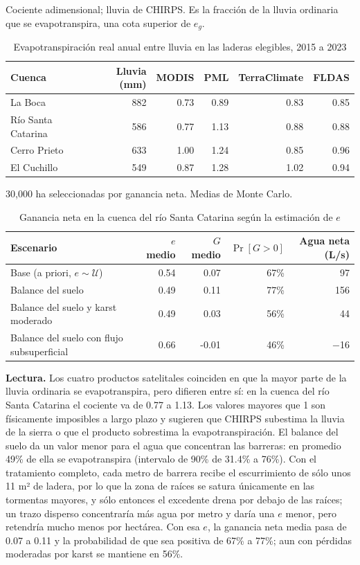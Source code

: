 \documentclass[11pt,letterpaper]{article}
\newcommand{\lectura}[1]{\par\noindent\textcolor{naranja}{\textbf{Lectura.}} #1\par}
\begin{document}
\begin{table}[H]\centering\small
\caption{Evapotranspiración real anual entre lluvia en las laderas elegibles, 2015 a 2023}\label{tab:et_sat}
{\color{gris}Cociente adimensional; lluvia de CHIRPS. Es la fracción de la lluvia ordinaria que se evapotranspira, una cota superior de $e_g$.\par}\smallskip
\begin{tabularx}{\linewidth}{Xrrrrr}
\toprule
Cuenca & Lluvia (mm) & MODIS & PML & TerraClimate & FLDAS \\
\midrule
La Boca & 882 & 0.73 & 0.89 & 0.83 & 0.85 \\
Río Santa Catarina & 586 & 0.77 & 1.13 & 0.88 & 0.88 \\
Cerro Prieto & 633 & 1.00 & 1.24 & 0.85 & 0.96 \\
El Cuchillo & 549 & 0.87 & 1.28 & 1.02 & 0.94 \\
\bottomrule
\end{tabularx}
\end{table}

\begin{table}[H]\centering\small
\caption{Ganancia neta en la cuenca del río Santa Catarina según la estimación de $e$}\label{tab:et_net}
{\color{gris}30,000 ha seleccionadas por ganancia neta. Medias de Monte Carlo.\par}\smallskip
\begin{tabularx}{\linewidth}{Xrrrr}
\toprule
Escenario & $e$ medio & $G$ medio & $\Pr[G>0]$ & Agua neta (L/s) \\
\midrule
Base (a priori, $e\sim\mathcal U$) & 0.54 & 0.07 & 67\% & 97 \\
Balance del suelo & 0.49 & 0.11 & 77\% & 156 \\
Balance del suelo y karst moderado & 0.49 & 0.03 & 56\% & 44 \\
Balance del suelo con flujo subsuperficial & 0.66 & -0.01 & 46\% & −16 \\
\bottomrule
\end{tabularx}
\end{table}

\lectura{Los cuatro productos satelitales coinciden en que la mayor parte de la lluvia ordinaria se evapotranspira, pero difieren entre sí: en la cuenca del río Santa Catarina el cociente va de 0.77 a 1.13. Los valores mayores que 1 son físicamente imposibles a largo plazo y sugieren que CHIRPS subestima la lluvia de la sierra o que el producto sobrestima la evapotranspiración. El balance del suelo da un valor menor para el agua que concentran las barreras: en promedio 49\% de ella se evapotranspira (intervalo de 90\% de 31.4\% a 76\%). Con el tratamiento completo, cada metro de barrera recibe el escurrimiento de sólo unos 11 m² de ladera, por lo que la zona de raíces se satura únicamente en las tormentas mayores, y sólo entonces el excedente drena por debajo de las raíces; un trazo disperso concentraría más agua por metro y daría una $e$ menor, pero retendría mucho menos por hectárea. Con esa $e$, la ganancia neta media pasa de 0.07 a 0.11 y la probabilidad de que sea positiva de 67\% a 77\%; aun con pérdidas moderadas por karst se mantiene en 56\%.}
\end{document}
